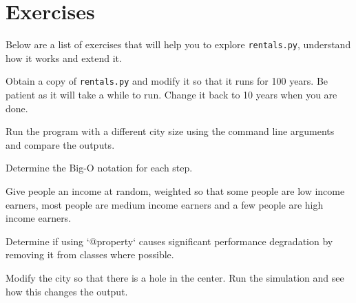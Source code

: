 \section{Exercises}

\par
Below are a list of exercises that will help you to explore \texttt{rentals.py},  understand how it works and extend it.

\begin{excercise}
Obtain a copy of \texttt{rentals.py} and modify it so that it runs for 100 years. Be patient as it will take a while to run. Change it back to 10 years when you are done.
\end{excercise}

\begin{excercise}
Run the program with a different city size using the command line arguments and compare the outputs.
\end{excercise}

\begin{excercise}
Determine the Big-O notation for each step.
\end{excercise}

\begin{excercise}
Give people an income at random, weighted so that some people are low income earners, most people are medium income earners and a few people are high income earners.
\end{excercise}

\begin{excercise}
Determine if using `@property` causes significant performance degradation by removing it from classes where possible.
\end{excercise}

\begin{excercise}
Modify the city so that there is a hole in the center. Run the simulation and see how this changes the output.
\end{excercise}
